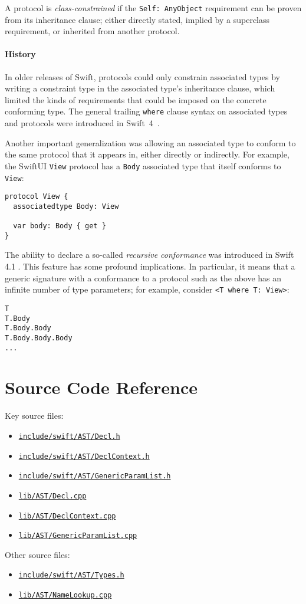 \documentclass[a4paper,headsepline,bibliography=totoc,toc=flat,fleqn,twoside=semi]{scrbook}
\theoremstyle{definition}
\theoremstyle{definition}
\theoremstyle{definition}
\newcommand{\SourceFile}[1]{\href{https://github.com/apple/swift/tree/main/#1}{\texttt{#1}}}
\begin{document}
A protocol is \emph{class-constrained} if the \texttt{Self:~AnyObject} requirement can be proven from its inheritance clause; either directly stated, implied by a superclass requirement, or inherited from another protocol.

\paragraph{History}
In older releases of Swift, protocols could only constrain associated types by writing a constraint type in the associated type's inheritance clause, which limited the kinds of requirements that could be imposed on the concrete conforming type. The general trailing \texttt{where} clause syntax on associated types and protocols were introduced in Swift~4~\cite{se0142}.

Another important generalization was allowing an associated type to conform to the same protocol that it appears in, either directly or indirectly. For example, the SwiftUI \texttt{View} protocol has a \texttt{Body} associated type that itself conforms to \texttt{View}:
\begin{Verbatim}
protocol View {
  associatedtype Body: View
  
  var body: Body { get }
}
\end{Verbatim}
The ability to declare a so-called \emph{recursive conformance} was introduced in Swift 4.1 \cite{se0157}. This feature has some profound implications. In particular, it means that a generic signature with a conformance to a protocol such as the above has an infinite number of type parameters; for example, consider \texttt{<T where T:\ View>}:
\begin{Verbatim}
T
T.Body
T.Body.Body
T.Body.Body.Body
...
\end{Verbatim}

\section{Source Code Reference}\label{genericdeclsourceref}

Key source files:
\begin{itemize}
\item \SourceFile{include/swift/AST/Decl.h}
\item \SourceFile{include/swift/AST/DeclContext.h}
\item \SourceFile{include/swift/AST/GenericParamList.h}
\item \SourceFile{lib/AST/Decl.cpp}
\item \SourceFile{lib/AST/DeclContext.cpp}
\item \SourceFile{lib/AST/GenericParamList.cpp}
\end{itemize}
Other source files:
\begin{itemize}
\item \SourceFile{include/swift/AST/Types.h}
\item \SourceFile{lib/AST/NameLookup.cpp}
\end{itemize}
\end{document}
